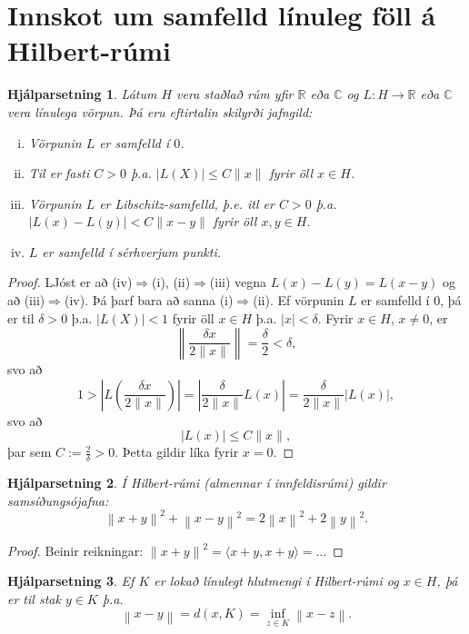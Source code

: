 \documentclass[a4paper,icelandic,11pt]{book}
\theoremstyle{plain}      \newtheorem{setn}{Setning}[chapter]
\newtheorem{lemma}[setn]{Hjálparsetning}
\theoremstyle{definition} \newtheorem{skilgr}[setn]{Skilgreining}
\theoremstyle{remark}     \newtheorem*{ath}{Athugasemd}
\newcommand{\R}{\mathbb R}
\newcommand{\C}{\mathbb C}
\begin{document}
\section{Innskot um samfelld línuleg föll á Hilbert-rúmi}
\begin{lemma}
  Látum $H$ vera staðlað rúm yfir $\R$ eða $\C$ og $L:H\to\R$ eða $\C$
  vera línulega vörpun. Þá eru eftirtalin skilyrði jafngild:
  \begin{enumerate}[(i)]
  \item Vörpunin $L$ er samfelld í $0$.
  \item Til er fasti $C>0$ þ.a. $|L(X)|\le C\|x\|$ fyrir öll $x\in H$.
  \item Vörpunin $L$ er Libschitz-samfelld, þ.e. itl er $C>0$
    þ.a. $|L(x)-L(y)|<C\|x-y\|$ fyrir öll $x,y\in H$.
  \item $L$ er samfelld í sérhverjum punkti.
  \end{enumerate}
\end{lemma}
\begin{proof}
  LJóst er að (iv)$\Rightarrow$(i), (ii)$\Rightarrow$(iii) vegna
  $L(x)-L(y) = L(x-y)$ og að (iii)$\Rightarrow$(iv). Þá þarf bara að
  sanna (i)$\Rightarrow$(ii). Ef vörpunin $L$ er samfelld í $0$, þá er
  til $\delta>0$ þ.a. $|L(X)|<1$ fyrir öll $x\in H$
  þ.a. $|x|<\delta$. Fyrir $x\in H$, $x\ne 0$, er 
  \[
  \left\| \frac{\delta x}{2\|x\|} \right\|
  = \frac{\delta}{2}
  < \delta,
  \]
  svo að 
  \[
  1
  > \left|
    L\left(\frac{\delta x}{2\|x\|}\right)    
  \right|
  = \left|
    \frac{\delta}{2\|x\|} L(x)
  \right|
  = \frac{\delta}{2\|x\|} |L(x)|,
  \]
  svo að 
  \[
  |L(x)| \le C\|x\|,
  \]
  þar sem $C:=\frac 2\delta > 0$. Þetta gildir líka fyrir $x = 0$.
\end{proof}
\begin{lemma}
  Í Hilbert-rúmi (almennar í innfeldisrúmi) gildir
  \emph{samsíðungsójafna}:
  \[
  \left\|
    x+y
  \right\|^{2}
  + \left\|
    x - y
  \right\|^{2}
  = 
  2 \left\|
    x
  \right\|^{2}
  + 2 \left\|
    y
  \right\|^{2}.
  \]
\end{lemma}
\begin{proof}
  Beinir reikningar: $\left\| x + y \right\|^{2} = \langle
  x+y,x+y\rangle = \dots$
\end{proof}
\begin{lemma}
  \label{lemma:Hilbert-jadar}
  Ef $K$ er lokað línulegt hlutmengi í Hilbert-rúmi og $x\in H$, þá er
  til stak $y\in K$ þ.a. 
  \[
  \left\|
    x-y
  \right\|
  = d(x,K)
  = \inf_{z\in K} \left\|
    x-z
  \right\|.
  \]
\end{lemma}
\end{document}
